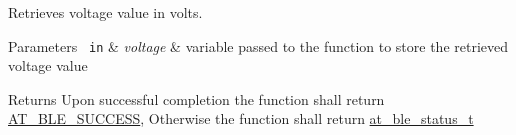 Retrieves voltage value in volts. 


\begin{DoxyParams}[1]{Parameters}
\mbox{\texttt{ in}}  & {\em voltage} & variable passed to the function to store the retrieved voltage value\\
\hline
\end{DoxyParams}
\begin{DoxyReturn}{Returns}
Upon successful completion the function shall return \mbox{\hyperlink{group__error__codes__group_gga3b1db9b95feb157b3c188ca27fe76988a7e3bfff5387331cd4f2c56cbcbbd7e19}{A\+T\+\_\+\+B\+L\+E\+\_\+\+S\+U\+C\+C\+E\+SS}}, Otherwise the function shall return \mbox{\hyperlink{at__ble__api_8h_ace24eb4e5ca3f325c663b809da5feb92}{at\+\_\+ble\+\_\+status\+\_\+t}} 
\end{DoxyReturn}
